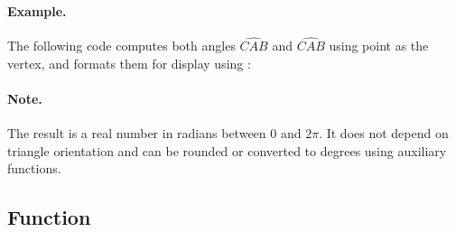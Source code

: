 \paragraph{Example.}
The following code computes both angles $ \widehat{CAB}$ and $ \widehat{CAB}$ using point  as the vertex, and formats them for display using :

\begin{minipage}{0.58\textwidth}
\begin{tkzexample}
\end{tkzexample}

\begin{tkzexample}
\end{tkzexample}
\end{minipage}
\hfill
\begin{minipage}{0.40\textwidth}
\begin{center}
\end{center}
\end{minipage}

\paragraph{Note.}
The result is a real number in radians between $0$ and $2\pi$. It does not depend on triangle orientation and can be rounded or converted to degrees using auxiliary functions.

\subsection{Function }
\label{sub:dot_or_scalar_product}

